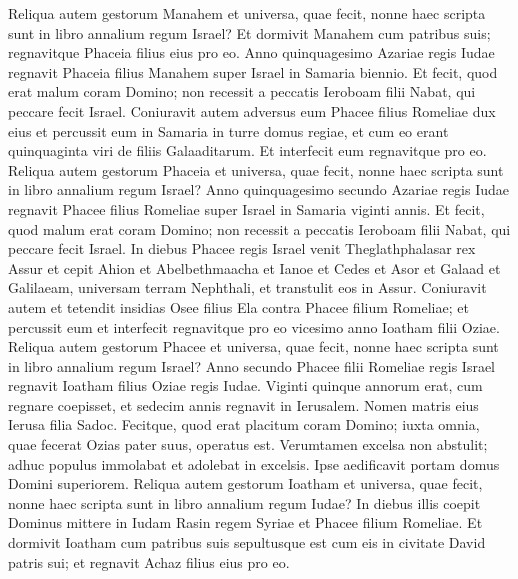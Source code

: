 \begin{biblechapter}
\verse Reliqua autem gestorum Manahem et universa, quae fecit, nonne haec scripta sunt in libro annalium regum Israel? 
\verse Et dormivit Manahem cum patribus suis; regnavitque Phaceia filius eius pro eo. 
\verse Anno quinquagesimo Azariae regis Iudae regnavit Phaceia filius Manahem super Israel in Samaria biennio. 
\verse Et fecit, quod erat malum coram Domino; non recessit a peccatis Ieroboam filii Nabat, qui peccare fecit Israel. 
\verse Coniuravit autem adversus eum Phacee filius Romeliae dux eius et percussit eum in Samaria in turre domus regiae, et cum eo erant quinquaginta viri de filiis Galaaditarum. Et interfecit eum regnavitque pro eo. 
\verse Reliqua autem gestorum Phaceia et universa, quae fecit, nonne haec scripta sunt in libro annalium regum Israel? 
\verse Anno quinquagesimo secundo Azariae regis Iudae regnavit Phacee filius Romeliae super Israel in Samaria viginti annis. 
\verse Et fecit, quod malum erat coram Domino; non recessit a peccatis Ieroboam filii Nabat, qui peccare fecit Israel. 
\verse In diebus Phacee regis Israel venit Theglathphalasar rex Assur et cepit Ahion et Abelbethmaacha et Ianoe et Cedes et Asor et Galaad et Galilaeam, universam terram Nephthali, et transtulit eos in Assur. 
\verse Coniuravit autem et tetendit insidias Osee filius Ela contra Phacee filium Romeliae; et percussit eum et interfecit regnavitque pro eo vicesimo anno Ioatham filii Oziae. 
\verse Reliqua autem gestorum Phacee et universa, quae fecit, nonne haec scripta sunt in libro annalium regum Israel? 
\verse Anno secundo Phacee filii Romeliae regis Israel regnavit Ioatham filius Oziae regis Iudae. 
\verse Viginti quinque annorum erat, cum regnare coepisset, et sedecim annis regnavit in Ierusalem. Nomen matris eius Ierusa filia Sadoc.  
\verse Fecitque, quod erat placitum coram Domino; iuxta omnia, quae fecerat Ozias pater suus, operatus est. 
\verse Verumtamen excelsa non abstulit; adhuc populus immolabat et adolebat in excelsis. Ipse aedificavit portam domus Domini superiorem. 
\verse Reliqua autem gestorum Ioatham et universa, quae fecit, nonne haec scripta sunt in libro annalium regum Iudae? 
\verse In diebus illis coepit Dominus mittere in Iudam Rasin regem Syriae et Phacee filium Romeliae. 
\verse Et dormivit Ioatham cum patribus suis sepultusque est cum eis in civitate David patris sui; et regnavit Achaz filius eius pro eo. 
\end{biblechapter}

